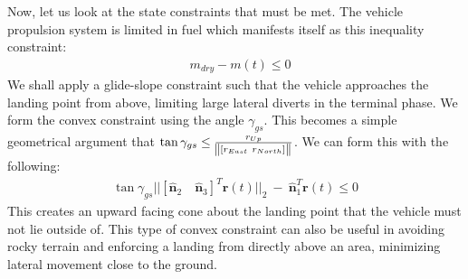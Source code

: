 Now, let us look at the state constraints that must be met. The vehicle propulsion system is limited in fuel which manifests itself as this inequality constraint:
\begin{align}
& m_{dry} - m(t) \leq 0
\end{align}
%
We shall apply a glide-slope constraint such that the vehicle approaches the landing point from above, limiting large lateral diverts in the terminal phase. We form the convex constraint using the angle $\gamma_{gs}$. This becomes a simple geometrical argument that $\tan{\gamma_{gs}} \leq \frac{r_{Up}}{\norm{[ r_{East} \ r_{North}]}}$. We can form this with the following:
\begin{align}
\tan{\gamma_{gs}} || [\hat{\bm{n}}_2 \quad \hat{\bm{n}}_3 ]^T \mathbf{r}(t) \lvert\lvert_2 \ - \ \hat{\bm{n}}_1^T \mathbf{r}(t) \leq 0
\end{align}
This  creates an upward facing cone about the landing point that the vehicle must not lie outside of. This type of convex constraint can also be useful in avoiding rocky terrain and enforcing a landing from directly above an area, minimizing lateral movement close to the ground.


